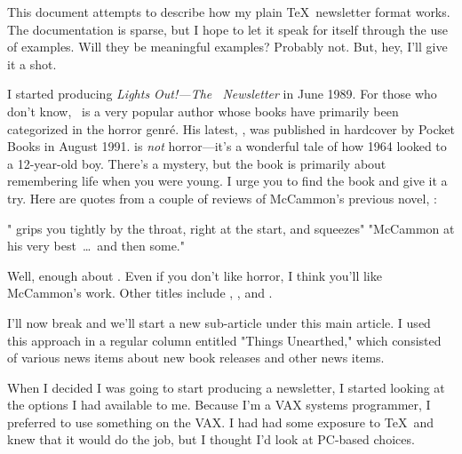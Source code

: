 \handlefigures                          %
\noindent
This document attempts to describe how my plain \TeX\ newsletter format works.
The documentation is sparse, but I hope to let it speak for itself through
the use of examples.  Will they be meaningful examples?  Probably not.  But,
hey, I'll give it a shot.

I started producing {\it Lights Out!---The \RRM\ Newsletter\/}
in June 1989.  For those who don't know, \RRM\ is a very popular author whose
books have primarily been categorized in the horror genr\'e.  His latest,
, was published in hardcover by Pocket Books in August 1991.
 is {\sl not\/} horror---it's a wonderful tale of how 1964
looked to a 12-year-old boy.  There's a mystery, but the book is primarily
about remembering life when you were young.  I urge you to find the book and
give it a try.  Here are quotes from a couple of reviews of McCammon's previous
novel, :

%
%
\bgroup                         %
\listindent{10pt}\beginlist
\dotitem        " grips you tightly by the throat, right at the
                start, and squeezes\edots" 
\dotitem        "McCammon at his very best\ \dots\ and then some."
\endlist
\egroup

\noindent                       %
Well, enough about \RRM.  Even if you don't like horror, I think you'll like
McCammon's work.  Other titles include , ,
and .

I'll now break and we'll start a new sub-article under this main
article.  I used this approach in a regular column entitled "Things Unearthed,"
which consisted of various news items about new book releases and other
news items.

%
%
\articlesep

When I decided I was going to start producing a newsletter, I started looking
at the options I had available to me.  Because I'm a VAX systems programmer,
I preferred to use something on the VAX.  I had had some exposure to \TeX\ and
knew that it would do the job, but I thought I'd look at PC-based choices.

